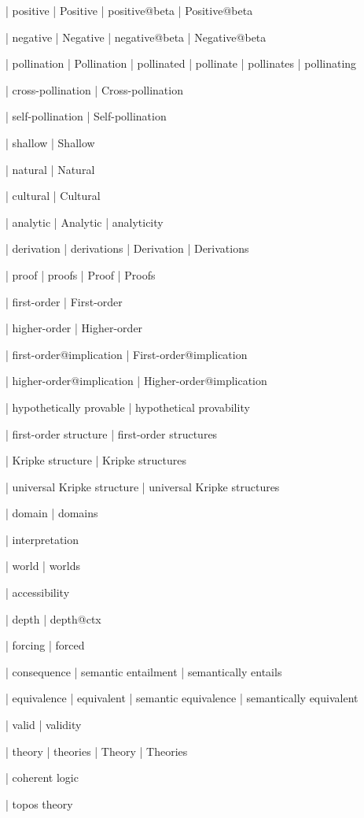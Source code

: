  | positive
 | Positive
 | positive@beta
 | Positive@beta

 | negative
 | Negative
 | negative@beta
 | Negative@beta

 | pollination
 | Pollination
 | pollinated
 | pollinate
 | pollinates
 | pollinating

 | cross-pollination
 | Cross-pollination

 | self-pollination
 | Self-pollination

 | shallow
 | Shallow

 | natural
 | Natural

 | cultural
 | Cultural

 | analytic
 | Analytic
 | analyticity

 | derivation
 | derivations
 | Derivation
 | Derivations

 | proof
 | proofs
 | Proof
 | Proofs
 
 | first-order
 | First-order

 | higher-order
 | Higher-order

 | first-order@implication
 | First-order@implication

 | higher-order@implication
 | Higher-order@implication

 | hypothetically provable
 | hypothetical provability

 | first-order structure
 | first-order structures

 | Kripke structure
 | Kripke structures

 | universal Kripke structure
 | universal Kripke structures

 | domain
 | domains

 | interpretation

 | world
 | worlds

 | accessibility

 | depth
 | depth@ctx

 | forcing
 | forced

 | consequence
 | semantic entailment
 | semantically entails

 | equivalence
 | equivalent
 | semantic equivalence
 | semantically equivalent

 | valid
 | validity

 | theory
 | theories
 | Theory
 | Theories

 | coherent logic

 | topos theory